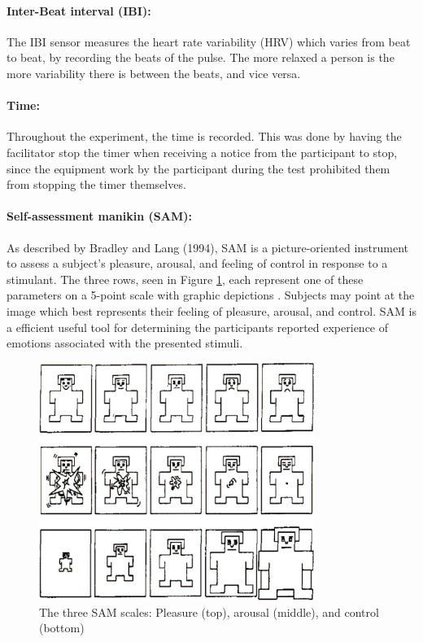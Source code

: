 \paragraph{Inter-Beat interval (IBI):} The IBI sensor measures the heart rate variability (HRV) which varies from beat to beat, by recording the beats of the pulse. The more relaxed a person is the more variability there is between the beats, and vice versa. 
\paragraph{Time:} Throughout the experiment, the time is recorded. This was done by having the facilitator stop the timer when receiving a notice from the participant to stop, since the equipment work by the participant during the test prohibited them from stopping the timer themselves.
\paragraph{Self-assessment manikin (SAM):} As described by Bradley and Lang (1994), SAM is a picture-oriented instrument to assess a subject’s pleasure, arousal, and feeling of control in response to a stimulant. The three rows, seen in Figure \ref{fig:SAM}, each represent one of these parameters on a 5-point scale with graphic depictions \cite{Bradley1994}. Subjects may point at the image which best represents their feeling of pleasure, arousal, and control. SAM is a efficient useful tool for determining the participants reported experience of emotions associated with the presented stimuli. 

\begin{figure}[h!]
    \centering
    \includegraphics[width=0.8\textwidth]{figures/SAM.png}
    \caption{The three SAM scales: Pleasure (top), arousal (middle), and control (bottom) \cite{Bradley1994}}\label{fig:SAM}
\end{figure}

